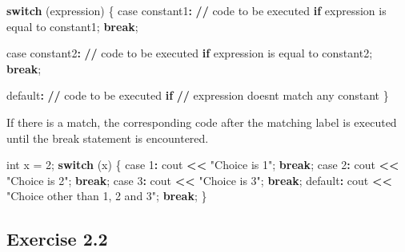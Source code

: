 \documentclass[
]{article}
\newenvironment{Shaded}{\begin{snugshade}}{\end{snugshade}}
\newcommand{\ControlFlowTok}[1]{\textcolor[rgb]{0.13,0.29,0.53}{\textbf{#1}}}
\newcommand{\DecValTok}[1]{\textcolor[rgb]{0.00,0.00,0.81}{#1}}
\newcommand{\ErrorTok}[1]{\textcolor[rgb]{0.64,0.00,0.00}{\textbf{#1}}}
\newcommand{\NormalTok}[1]{#1}
\newcommand{\OtherTok}[1]{\textcolor[rgb]{0.56,0.35,0.01}{#1}}
\newcommand{\SpecialCharTok}[1]{\textcolor[rgb]{0.81,0.36,0.00}{\textbf{#1}}}
\newcommand{\StringTok}[1]{\textcolor[rgb]{0.31,0.60,0.02}{#1}}
\begin{document}
\begin{Shaded}
\begin{Highlighting}[]
\ControlFlowTok{switch}\NormalTok{ (expression) \{}
\NormalTok{    case constant1}\SpecialCharTok{:}
        \ErrorTok{//}\NormalTok{ code to be executed }\ControlFlowTok{if}\NormalTok{ expression is equal to constant1;}
        \ControlFlowTok{break}\NormalTok{;}

\NormalTok{    case constant2}\SpecialCharTok{:}
        \ErrorTok{//}\NormalTok{ code to be executed }\ControlFlowTok{if}\NormalTok{ expression is equal to constant2;}
        \ControlFlowTok{break}\NormalTok{;}

\NormalTok{    default}\SpecialCharTok{:}
        \ErrorTok{//}\NormalTok{ code to be executed }\ControlFlowTok{if}
        \SpecialCharTok{/}\ErrorTok{/}\NormalTok{ expression doesn}\StringTok{\textquotesingle{}t match any constant}
\StringTok{\}}
\end{Highlighting}
\end{Shaded}

If there is a match, the corresponding code after the matching label is
executed until the break statement is encountered.

\begin{Shaded}
\begin{Highlighting}[]
\NormalTok{int x }\OtherTok{=} \DecValTok{2}\NormalTok{; }
\ControlFlowTok{switch}\NormalTok{ (x) }
\NormalTok{\{ }
\NormalTok{    case }\DecValTok{1}\SpecialCharTok{:} 
\NormalTok{        cout }\SpecialCharTok{\textless{}}\ErrorTok{\textless{}} \StringTok{"Choice is 1"}\NormalTok{; }
        \ControlFlowTok{break}\NormalTok{; }
\NormalTok{    case }\DecValTok{2}\SpecialCharTok{:} 
\NormalTok{        cout }\SpecialCharTok{\textless{}}\ErrorTok{\textless{}} \StringTok{"Choice is 2"}\NormalTok{; }
        \ControlFlowTok{break}\NormalTok{; }
\NormalTok{    case }\DecValTok{3}\SpecialCharTok{:} 
\NormalTok{        cout }\SpecialCharTok{\textless{}}\ErrorTok{\textless{}} \StringTok{"Choice is 3"}\NormalTok{; }
        \ControlFlowTok{break}\NormalTok{; }
\NormalTok{    default}\SpecialCharTok{:} 
\NormalTok{        cout }\SpecialCharTok{\textless{}}\ErrorTok{\textless{}} \StringTok{"Choice other than 1, 2 and 3"}\NormalTok{; }
        \ControlFlowTok{break}\NormalTok{; }
\NormalTok{\}}
\end{Highlighting}
\end{Shaded}

\subsection{Exercise 2.2}\label{exercise-2.2}
\end{document}
